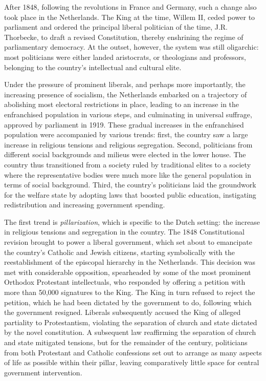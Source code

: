     After 1848, following the revolutions in France and Germany, such a change also took place in the Netherlands. The King at the time, Willem II, ceded power to parliament and ordered the principal liberal politician of the time, J.R. Thorbecke, to draft a revised Constitution, thereby enshrining the regime of parliamentary democracy. At the outset, however, the system was still oligarchic: most politicians were either landed aristocrats, or theologians and professors, belonging to the country's intellectual and cultural elite. 

    Under the pressure of prominent liberals, and perhaps more importantly, the increasing presence of socialism, the Netherlands embarked on a trajectory of abolishing most electoral restrictions in place, leading to an increase in the enfranchised population in various steps, and culminating in universal suffrage, approved by parliament in 1919. These gradual increases in the enfranchised population were accompanied by various trends: first, the country saw a large increase in religious tensions and religious segregation. Second, politicians from different social backgrounds and milieus were elected in the lower house. The country thus transitioned from a society ruled by traditional elites to a society where the representative bodies were much more like the general population in terms of social background. \autocite{van1983toegang} Third, the country's politicians laid the groundwork for the welfare state by adopting laws that boosted public education, instigating redistribution and increasing government spending. 

    The first trend is \textit{pillarization}, which is specific to the Dutch setting: the increase in religious tensions and segregation in the country. The 1848 Constitutional revision brought to power a liberal government, which set about to emancipate the country's Catholic and Jewish citizens, starting symbolically with the reestablishment of the episcopal hierarchy in the Netherlands. This decision was met with considerable opposition, spearheaded by some of the most prominent Orthodox Protestant intellectuals, who responded by offering a petition with more than 50,000 signatures to the King. The King in turn refused to reject the petition, which he had been dictated by the government to do, following which the government resigned. \autocite{oud1961honderd} Liberals subsequently accused the King of alleged partiality to Protestantism, violating the separation of church and state dictated by the novel constitution. A subsequent law reaffirming the separation of church and state mitigated tensions, but for the remainder of the century, politicians from both Protestant and Catholic confessions set out to arrange as many aspects of life as possible within their pillar, leaving comparatively little space for central government intervention. \autocite{van2013eerste}

